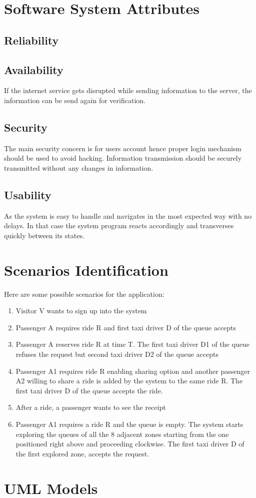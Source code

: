 \section{Software System Attributes}

\subsection{Reliability}

\subsection{Availability}
If the internet service gets disrupted while sending information to the server, the information can be send again for verification.

\subsection{Security}
The main security concern is for users account hence proper login mechanism should be used to avoid hacking. Information transmission should be securely transmitted without any changes in information.

\subsection{Usability}
As the system is easy to handle and navigates in the most expected way with no delays. In that case the system program reacts accordingly and transverses quickly between its states.

\section{Scenarios Identification}
Here are some possible scenarios for the application:
\begin{enumerate}
	\item Visitor V wants to sign up into the system 
	\item Passenger A requires ride R and first taxi driver D of the queue accepts
	\item Passenger A reserves ride R at time T. The first taxi driver D1 of the queue refuses the request but second taxi driver D2 of the queue accepts
	\item Passenger A1 requires ride R enabling sharing option and another passenger A2 willing to share a ride is added by the system to the same ride R. The first taxi driver D of the queue accepts the ride.
	\item After a ride, a passenger wants to see the receipt
	\item Passenger A1 requires a ride R and the queue is empty. The system starts exploring the queues of all the 8 adjacent zones starting from the one positioned right above and proceeding clockwise. The first taxi driver D of the first explored zone, accepts the request.
\end{enumerate}

\section{UML Models}